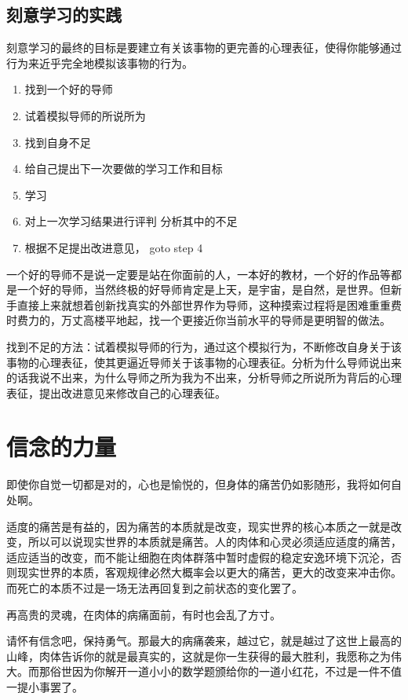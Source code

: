 \documentclass[12pt,oneside]{book}
\begin{document}
\section{刻意学习的实践}
刻意学习的最终的目标是要建立有关该事物的更完善的心理表征，使得你能够通过行为来近乎完全地模拟该事物的行为。

\begin{enumerate}
\item 找到一个好的导师
\item 试着模拟导师的所说所为
\item 找到自身不足
\item 给自己提出下一次要做的学习工作和目标
\item 学习
\item 对上一次学习结果进行评判 分析其中的不足 
\item 根据不足提出改进意见， goto step 4
\end{enumerate}

一个好的导师不是说一定要是站在你面前的人，一本好的教材，一个好的作品等都是一个好的导师，当然终极的好导师肯定是上天，是宇宙，是自然，是世界。但新手直接上来就想着创新找真实的外部世界作为导师，这种摸索过程将是困难重重费时费力的，万丈高楼平地起，找一个更接近你当前水平的导师是更明智的做法。

找到不足的方法：试着模拟导师的行为，通过这个模拟行为，不断修改自身关于该事物的心理表征，使其更逼近导师关于该事物的心理表征。分析为什么导师说出来的话我说不出来，为什么导师之所为我为不出来，分析导师之所说所为背后的心理表征，提出改进意见来修改自己的心理表征。




\chapter{信念的力量}
即使你自觉一切都是对的，心也是愉悦的，但身体的痛苦仍如影随形，我将如何自处啊。

适度的痛苦是有益的，因为痛苦的本质就是改变，现实世界的核心本质之一就是改变，所以可以说现实世界的本质就是痛苦。人的肉体和心灵必须适应适度的痛苦，适应适当的改变，而不能让细胞在肉体群落中暂时虚假的稳定安逸环境下沉沦，否则现实世界的本质，客观规律必然大概率会以更大的痛苦，更大的改变来冲击你。而死亡的本质不过是一场无法再回复到之前状态的变化罢了。

再高贵的灵魂，在肉体的病痛面前，有时也会乱了方寸。

请怀有信念吧，保持勇气。那最大的病痛袭来，越过它，就是越过了这世上最高的山峰，肉体告诉你的就是最真实的，这就是你一生获得的最大胜利，我愿称之为伟大。而那俗世因为你解开一道小小的数学题颁给你的一道小红花，不过是一件不值一提小事罢了。
\end{document}
